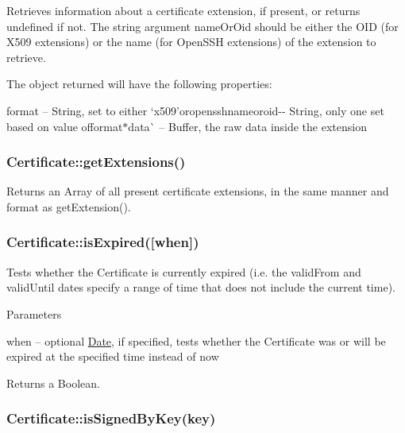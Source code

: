 Retrieves information about a certificate extension, if present, or returns {\ttfamily undefined} if not. The string argument {\ttfamily name\+Or\+Oid} should be either the O\+ID (for X509 extensions) or the name (for Open\+S\+SH extensions) of the extension to retrieve.

The object returned will have the following properties\+:


\begin{DoxyItemize}
\item {\ttfamily format} -- String, set to either `\textquotesingle{}x509'{\ttfamily or}\textquotesingle{}openssh\textquotesingle{}{\ttfamily  $\ast$}name{\ttfamily or}oid{\ttfamily -\/-\/ String, only one set based on value of}format{\ttfamily  $\ast$}data\`{} -- Buffer, the raw data inside the extension
\end{DoxyItemize}

\subsubsection*{{\ttfamily Certificate\+::get\+Extensions()}}

Returns an Array of all present certificate extensions, in the same manner and format as {\ttfamily get\+Extension()}.

\subsubsection*{{\ttfamily Certificate\+::is\+Expired(\mbox{[}when\mbox{]})}}

Tests whether the Certificate is currently expired (i.\+e. the {\ttfamily valid\+From} and {\ttfamily valid\+Until} dates specify a range of time that does not include the current time).

Parameters


\begin{DoxyItemize}
\item {\ttfamily when} -- optional \mbox{\hyperlink{classDate}{Date}}, if specified, tests whether the Certificate was or will be expired at the specified time instead of now
\end{DoxyItemize}

Returns a Boolean.

\subsubsection*{{\ttfamily Certificate\+::is\+Signed\+By\+Key(key)}}

